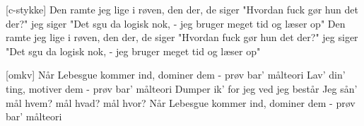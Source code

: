\documentclass[a4paper,11pt]{article}
\begin{document}
\begin{song}
[c-stykke]%
Den ramte jeg lige i røven, den der, de siger
"Hvordan fuck gør hun det der?" jeg siger
"Det sgu da logisk nok, - jeg bruger meget tid og læser op"
Den ramte jeg lige i røven, den der, de siger
"Hvordan fuck gør hun det der?" jeg siger
"Det sgu da logisk nok, - jeg bruger meget tid og læser op"

[omkv]%
Når Lebesgue kommer ind, dominer dem - prøv bar’ målteori
Lav’ din’ ting, motiver dem - prøv bar’ målteori
Dumper ik’ for jeg ved jeg består
Jeg sån’ mål hvem? mål hvad? mål hvor?
Når Lebesgue kommer ind, dominer dem - prøv bar’ målteori

\end{song}
\end{document}

